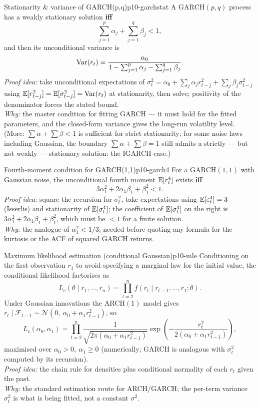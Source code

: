 \begin{proposition}{Stationarity \& variance of GARCH(p,q)}{p10-garchstat}
A $\mathrm{GARCH}(p,q)$ process has a weakly stationary solution \textbf{iff}
\[
\sum_{j=1}^{p}\alpha_j+\sum_{j=1}^{q}\beta_j<1,
\]
and then its unconditional variance is
\[
\operatorname{Var}(r_t)=\frac{\alpha_0}{1-\sum_{j=1}^{p}\alpha_j-\sum_{j=1}^{q}\beta_j}.
\]
\textit{Proof idea:} take unconditional expectations of
$\sigma_t^2=\alpha_0+\sum_j\alpha_j r_{t-j}^2+\sum_j\beta_j\sigma_{t-j}^2$ using
$\mathbb{E}[r_{t-j}^2]=\mathbb{E}[\sigma_{t-j}^2]=\operatorname{Var}(r_t)$ at stationarity, then solve; positivity
of the denominator forces the stated bound.\\
\textit{Why:} the master condition for fitting GARCH --- it must hold for the
fitted parameters, and the closed-form variance gives the long-run volatility
level. (More: $\sum\alpha+\sum\beta<1$ is sufficient for strict stationarity; for
some noise laws including Gaussian, the boundary $\sum\alpha+\sum\beta=1$ still
admits a strictly --- but not weakly --- stationary solution: the IGARCH case.)
\end{proposition}

\begin{proposition}{Fourth-moment condition for GARCH(1,1)}{p10-garch4}
For a $\mathrm{GARCH}(1,1)$ with Gaussian noise, the unconditional fourth moment
$\mathbb{E}[r_t^4]$ exists \textbf{iff}
\[
3\alpha_1^2+2\alpha_1\beta_1+\beta_1^2<1 .
\]
\textit{Proof idea:} square the recursion for $\sigma_t^2$, take expectations
using $\mathbb{E}[\varepsilon_t^4]=3$ (Isserlis) and stationarity of $\mathbb{E}[\sigma_t^4]$; the
coefficient of $\mathbb{E}[\sigma_{t}^4]$ on the right is $3\alpha_1^2+2\alpha_1\beta_1+\beta_1^2$,
which must be $<1$ for a finite solution.\\
\textit{Why:} the analogue of $\alpha_1^2<1/3$; needed before quoting any
formula for the kurtosis or the ACF of squared GARCH returns.
\end{proposition}

\begin{proposition}{Maximum likelihood estimation (conditional Gaussian)}{p10-mle}
Conditioning on the first observation $r_1$ to avoid specifying a marginal law
for the initial value, the conditional likelihood factorises as
\[
L_c(\theta\mid r_1,\dots,r_n)=\prod_{t=2}^{n}f(r_t\mid r_{t-1},\dots,r_1;\theta).
\]
Under Gaussian innovations the $\mathrm{ARCH}(1)$ model gives
$r_t\mid\mathcal F_{t-1}\sim\mathcal N(0,\ \alpha_0+\alpha_1 r_{t-1}^2)$, so
\[
L_c(\alpha_0,\alpha_1)=\prod_{t=2}^{n}\frac{1}{\sqrt{2\pi(\alpha_0+\alpha_1 r_{t-1}^2)}}
\exp\!\left(-\frac{r_t^2}{2(\alpha_0+\alpha_1 r_{t-1}^2)}\right),
\]
maximised over $\alpha_0>0,\ \alpha_1\ge0$ (numerically; GARCH is analogous with
$\sigma_t^2$ computed by its recursion).\\
\textit{Proof idea:} the chain rule for densities plus conditional normality of
each $r_t$ given the past.\\
\textit{Why:} the standard estimation route for ARCH/GARCH; the per-term variance
$\sigma_t^2$ is what is being fitted, not a constant $\sigma^2$.
\end{proposition}

